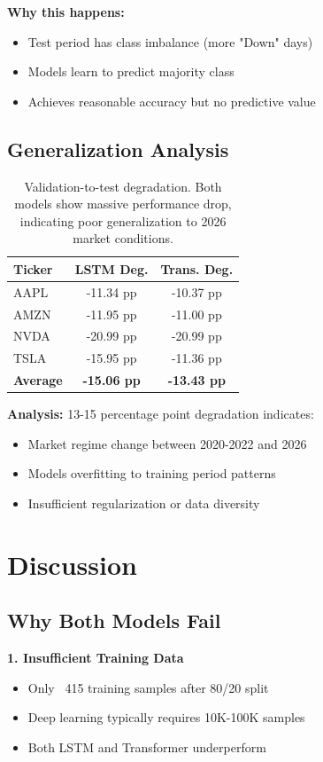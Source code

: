 \documentclass[10pt,twocolumn]{article}
\begin{document}
\textbf{Why this happens:}
\begin{itemize}
\item Test period has class imbalance (more "Down" days)
\item Models learn to predict majority class
\item Achieves reasonable accuracy but no predictive value
\end{itemize}

\subsection{Generalization Analysis}

\begin{table}[h]
\centering
\small
\begin{tabular}{lcc}
\toprule
Ticker & LSTM Deg. & Trans. Deg. \\
\midrule
AAPL & -11.34 pp & -10.37 pp \\
AMZN & -11.95 pp & -11.00 pp \\
NVDA & -20.99 pp & -20.99 pp \\
TSLA & -15.95 pp & -11.36 pp \\
\midrule
\textbf{Average} & \textbf{-15.06 pp} & \textbf{-13.43 pp} \\
\bottomrule
\end{tabular}
\caption{Validation-to-test degradation. Both models show massive performance drop, indicating poor generalization to 2026 market conditions.}
\end{table}

\textbf{Analysis:} 13-15 percentage point degradation indicates:
\begin{itemize}
\item Market regime change between 2020-2022 and 2026
\item Models overfitting to training period patterns
\item Insufficient regularization or data diversity
\end{itemize}

\section{Discussion}

\subsection{Why Both Models Fail}

\textbf{1. Insufficient Training Data}
\begin{itemize}
\item Only ~415 training samples after 80/20 split
\item Deep learning typically requires 10K-100K samples
\item Both LSTM and Transformer underperform
\end{itemize}
\end{document}
